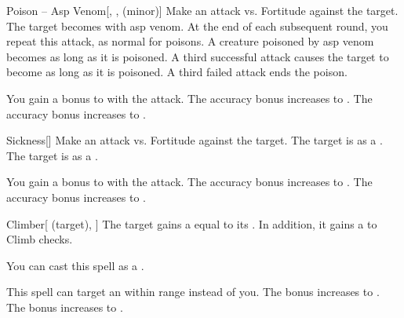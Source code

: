 \lowercase{\hypertarget{spell:Poison -- Asp Venom}{}}\label{spell:Poison -- Asp Venom}
\begin{freeability}[Rank 1]{\hypertarget{spell:Poison -- Asp Venom}{Poison -- Asp Venom}}[, ,  (minor)]
Make an attack vs. Fortitude against the target.
\hit The target becomes  with asp venom.
At the end of each subsequent round, you repeat this attack, as normal for poisons.
A creature poisoned by asp venom becomes  as long as it is poisoned.
A third successful attack causes the target to become  as long as it is poisoned.
A third failed attack ends the poison.

\rankline
{} You gain a  bonus to  with the attack.
 The accuracy bonus increases to .
 The accuracy bonus increases to .

\end{freeability}
\vspace{0.25em}



\lowercase{\hypertarget{spell:Sickness}{}}\label{spell:Sickness}
\begin{freeability}[Rank 1]{\hypertarget{spell:Sickness}{Sickness}}[]
Make an attack vs. Fortitude against the target.
\hit The target is  as a .
\crit The target is  as a .

\rankline
{} You gain a  bonus to  with the attack.
 The accuracy bonus increases to .
 The accuracy bonus increases to .

\end{freeability}
\vspace{0.25em}



\lowercase{\hypertarget{spell:Climber}{}}\label{spell:Climber}
\begin{attuneability}[Rank 2]{\hypertarget{spell:Climber}{Climber}}[ (target), ]
The target gains a  equal to its .
In addition, it gains a   to Climb checks.

You can cast this spell as a .

\rankline
{} This spell can target an  within \rngmed range instead of you.
 The bonus increases to .
 The bonus increases to .

\end{attuneability}
\vspace{0.25em}



